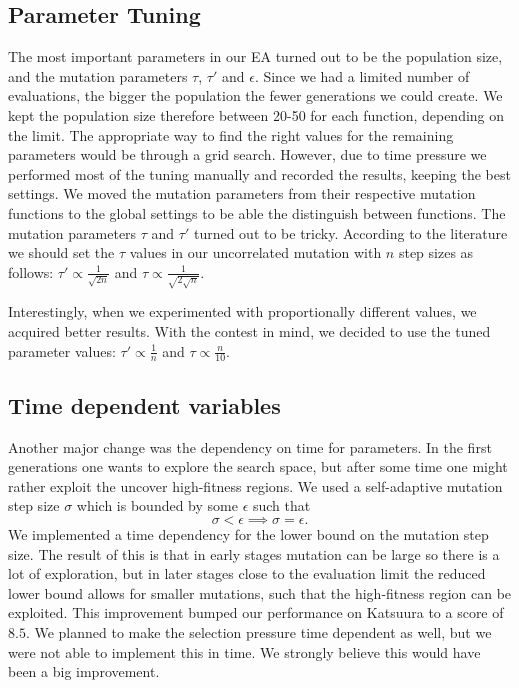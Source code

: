 \subsection{Parameter Tuning}
The most important parameters in our EA turned out to be the population size, and the mutation
parameters $\tau$, $\tau'$ and $\epsilon$. Since we had a limited number of evaluations, the bigger
the population the fewer generations we could create. We kept the population size therefore between
20-50 for each function, depending on the limit. The appropriate way to find the right values for
the remaining parameters would be through a grid search. However, due to time pressure we performed
most of
the tuning manually and recorded the results, keeping the best settings. We moved the mutation
parameters from their respective mutation functions to the global settings to be able the
distinguish between functions. The mutation parameters $\tau$ and $\tau'$ turned out to be tricky.
According to the literature we should set the $\tau$ values in our uncorrelated mutation with $n$
step sizes as follows: $\tau' \propto \frac{1}{\sqrt{2n}}$ and $\tau \propto
\frac{1}{\sqrt{2\sqrt{n}}}$.

Interestingly, when we experimented with proportionally different values, we acquired better
results. With the contest in mind, we decided to use the tuned parameter values: $\tau' \propto
\frac{1}{n}$ and $\tau \propto \frac{n}{10}$.

\subsection{Time dependent variables}
Another major change was the dependency on time for parameters. In the first generations one wants
to explore the search space, but after some time one might rather exploit the uncover high-fitness
regions. We used a self-adaptive mutation step size $\sigma$ which is bounded by some $\epsilon$
such that
\[
    \sigma < \epsilon \implies \sigma = \epsilon.
\]
We implemented a time dependency for the lower bound on the mutation step size. The result of this
is that in early stages mutation can be large so there is a lot of exploration, but in later stages
close to the evaluation limit the reduced lower bound allows for smaller mutations, such that the
high-fitness region can be exploited. This improvement bumped our performance on Katsuura to a
score of $8.5$. We planned to make the selection pressure time dependent as well, but we were not
able to implement this in time. We strongly believe this would have been a big improvement.


